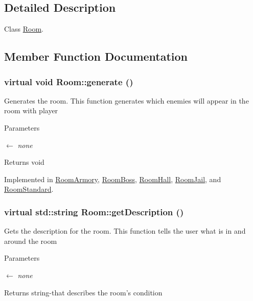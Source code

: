 \subsection{Detailed Description}
Class \hyperlink{classRoom}{Room}. 

\subsection{Member Function Documentation}
\hypertarget{classRoom_a3556128b8e7f544fa618576fbab4b52e}{
\subsubsection[{generate}]{\setlength{\rightskip}{0pt plus 5cm}virtual void Room::generate ()}}
\label{classRoom_a3556128b8e7f544fa618576fbab4b52e}


Generates the room. This function generates which enemies will appear in the room with player 
\begin{DoxyParams}{Parameters}
\item[\mbox{$\leftarrow$} {\em none}]\end{DoxyParams}
\begin{DoxyReturn}{Returns}
void 
\end{DoxyReturn}


Implemented in \hyperlink{classRoomArmory_a7b8a849994b2e71b1762420f08b5dcf2}{RoomArmory}, \hyperlink{classRoomBoss_a89ec3d9b6046f70dca3f802f0eed8694}{RoomBoss}, \hyperlink{classRoomHall_a346902d2885699dd4669314b4f500fc4}{RoomHall}, \hyperlink{classRoomJail_ae0c2bba84e14c607af53a55b3e4d1810}{RoomJail}, and \hyperlink{classRoomStandard_ae4b216dd6c57cc03dee20e1fd81c1180}{RoomStandard}.\hypertarget{classRoom_aacf839325fa7c6b08d21533b0780025c}{
\subsubsection[{getDescription}]{\setlength{\rightskip}{0pt plus 5cm}virtual std::string Room::getDescription ()}}
\label{classRoom_aacf839325fa7c6b08d21533b0780025c}


Gets the description for the room. This function tells the user what is in and around the room 
\begin{DoxyParams}{Parameters}
\item[\mbox{$\leftarrow$} {\em none}]\end{DoxyParams}
\begin{DoxyReturn}{Returns}
string-\/that describes the room's condition 
\end{DoxyReturn}


